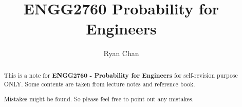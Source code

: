\documentclass[a4paper]{report}
\author{Ryan Chan}
\title{ENGG2760 Probability for Engineers}
\begin{document}
\setlength\parindent{0pt}


\maketitle

\newpage

\begin{abstract}
	This is a note for \textbf{ENGG2760 - Probability for Engineers} for self-revision purpose ONLY. Some contents are taken from lecture notes and reference book. 
	
	Mistakes might be found. So please feel free to point out any mistakes.
\end{abstract}

\newpage

\tableofcontents

\setlength{\parskip}{5pt}
\end{document}
